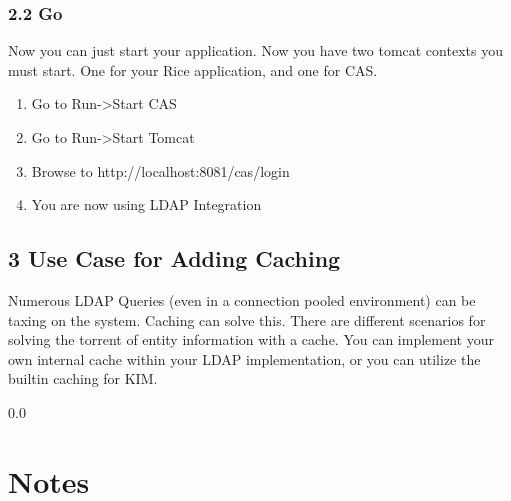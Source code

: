 \subsubsection*{2.2 Go}
Now you can just start your application. Now you have two tomcat
contexts you must start. One for your Rice application, and one for
CAS. 
\begin{enumerate}
\item Go to Run->Start CAS
\item Go to Run->Start Tomcat
\item Browse to http://localhost:8081/cas/login
\item You are now using LDAP Integration
\end{enumerate}

\subsection*{3 Use Case for Adding Caching}
Numerous LDAP Queries (even in a connection pooled environment) can be
taxing on the system. Caching can solve this. There are different
scenarios for solving the torrent of entity information with a
cache. You can implement your own internal cache within your LDAP
implementation, or you can utilize the builtin caching for KIM.

\newpage
{\setlength{\baselineskip}%
  {0.0\baselineskip}
  \section*{Notes}
  \hrulefill \par}